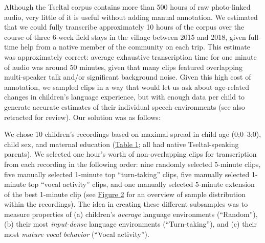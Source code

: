 \documentclass[floatsintext,man]{apa6}
\theoremstyle{definition}
\theoremstyle{definition}
\theoremstyle{definition}
\theoremstyle{remark}
\begin{document}
Although the Tseltal corpus contains more than 500 hours of raw
photo-linked audio, very little of it is useful without adding manual
annotation. We estimated that we could fully transcribe approximately 10
hours of the corpus over the course of three 6-week field stays in the
village between 2015 and 2018, given full-time help from a native member
of the community on each trip. This estimate was approximately correct:
average exhaustive transcription time for one minute of audio was around
50 minutes, given that many clips featured overlapping multi-speaker
talk and/or significant background noise. Given this high cost of
annotation, we sampled clips in a way that would let us ask about
age-related changes in children's language experience, but with enough
data per child to generate accurate estimates of their individual speech
environments (see also retracted for review). Our solution was as
follows:

We chose 10 children's recordings based on maximal spread in child age
(0;0--3;0), child sex, and maternal education
(\protect\hyperlink{tab1}{Table 1}; all had native Tseltal-speaking
parents). We selected one hour's worth of non-overlapping clips for
transcription from each recording in the following order: nine randomly
selected 5-minute clips, five manually selected 1-minute top
\enquote{turn-taking} clips, five manually selected 1-minute top
\enquote{vocal activity} clips, and one manually selected 5-minute
extension of the best 1-minute clip (see \protect\hyperlink{fig2}{Figure
2} for an overview of sample distribution within the recordings). The
idea in creating these different subsamples was to measure properties of
(a) children's \emph{average} language environments (\enquote{Random}),
(b) their most \emph{input-dense} language environments
(\enquote{Turn-taking}), and (c) their most \emph{mature vocal behavior}
(\enquote{Vocal activity}).
\end{document}
